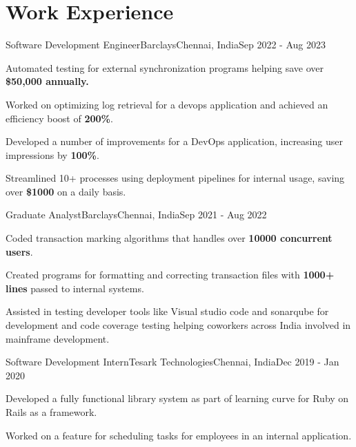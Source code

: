 \documentclass[letterpaper]{resume_config}
\begin{document}

\section{Work Experience}

\WorkExperience
    {Software Development Engineer}{Barclays}{}{Chennai, India}{Sep 2022 - Aug 2023}
    {
        \item{Automated testing for external synchronization programs helping save over \textbf{\$50,000 annually.}}
        \item {Worked on optimizing log retrieval for a devops application and achieved an efficiency boost of \textbf{200\%}.}
        \item {Developed a number of improvements for a DevOps application, increasing user impressions by \textbf{100\%}.} 
        \item {Streamlined 10+ processes using deployment pipelines for internal usage, saving over \textbf{\$1000} on a daily basis.}
    }
\WorkExperience
    {Graduate Analyst}{Barclays}{}{Chennai, India}{Sep 2021 - Aug 2022}
    {
        \item {Coded transaction marking algorithms that handles over \textbf{10000 concurrent users}.}
        \item {Created programs for formatting and correcting transaction files with \textbf{1000+ lines} passed to internal systems.}
        \item {Assisted in testing developer tools like Visual studio code and sonarqube for development and code coverage testing helping coworkers across India involved in mainframe development.}
    }
\WorkExperience
    {Software Development Intern}{Tesark Technologies}{}{Chennai, India}{Dec 2019 - Jan 2020}
    {
        \item {Developed a fully functional library system as part of learning curve for Ruby on Rails as a framework.}
        \item {Worked on a feature for scheduling tasks for employees in an internal application.}
    }

\vspace{-8pt}

\end{document}
